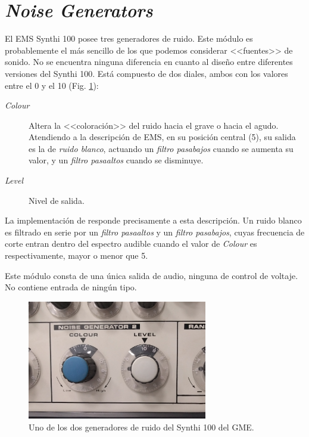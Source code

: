 \section{\textit{Noise Generators}}
\label{sec:noise_generators}

El EMS Synthi 100 posee tres generadores de ruido. Este módulo es probablemente el más sencillo de los que podemos considerar <<fuentes>> de sonido. No se encuentra ninguna diferencia en cuanto al diseño entre diferentes versiones del Synthi 100. Está compuesto de dos diales, ambos con los valores entre el 0 y el 10 (Fig. \ref{fig:noise_generator}):

\begin{description}
	\item[\textit{Colour}] Altera la <<coloración>> del ruido hacia el grave o hacia el agudo. Atendiendo a la descripción de EMS, en su posición central (5), su salida es la de \textit{ruido blanco}, actuando un \textit{filtro pasabajos} cuando se aumenta su valor, y un \textit{filtro pasaaltos} cuando se disminuye.
	\item[\textit{Level}] Nivel de salida.
\end{description}

La implementación de \className responde precisamente a esta descripción. Un ruido blanco es filtrado en serie por un \textit{filtro pasaaltos} y un \textit{filtro pasabajos}, cuyas frecuencia de corte entran dentro del espectro audible cuando el valor de \textit{Colour} es respectivamente, mayor o menor que 5.

Este módulo consta de una única salida de audio, ninguna de control de voltaje. No contiene entrada de ningún tipo.

\begin{figure}
	\centering
	\includegraphics[width=0.7\textwidth]{images/noise_generator}
	\caption{Uno de los dos generadores de ruido del Synthi 100 del GME.}
	\label{fig:noise_generator}
\end{figure}